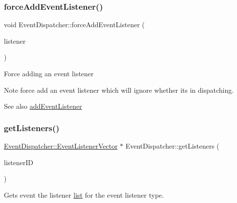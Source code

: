 \subsubsection{\texorpdfstring{force\+Add\+Event\+Listener()}{forceAddEventListener()}\hspace{0.1cm}{\footnotesize\ttfamily [2/2]}}
{\footnotesize\ttfamily void Event\+Dispatcher\+::force\+Add\+Event\+Listener (\begin{DoxyParamCaption}\item[{\hyperlink{classEventListener}{Event\+Listener} $\ast$}]{listener }\end{DoxyParamCaption})\hspace{0.3cm}{\ttfamily [protected]}}

Force adding an event listener \begin{DoxyNote}{Note}
force add an event listener which will ignore whether it\textquotesingle{}s in dispatching. 
\end{DoxyNote}
\begin{DoxySeeAlso}{See also}
\hyperlink{classEventDispatcher_aacb9cc74f76d66952e749f2cc1519444}{add\+Event\+Listener} 
\end{DoxySeeAlso}
\mbox{\label{classEventDispatcher_abbb502e7918b7d2e0033e2e6206b4e1e}} 
\subsubsection{\texorpdfstring{get\+Listeners()}{getListeners()}\hspace{0.1cm}{\footnotesize\ttfamily [1/2]}}
{\footnotesize\ttfamily \hyperlink{classEventDispatcher_1_1EventListenerVector}{Event\+Dispatcher\+::\+Event\+Listener\+Vector} $\ast$ Event\+Dispatcher\+::get\+Listeners (\begin{DoxyParamCaption}\item[{const Event\+Listener\+::\+Listener\+ID \&}]{listener\+ID }\end{DoxyParamCaption})\hspace{0.3cm}{\ttfamily [protected]}}

Gets event the listener \hyperlink{protocollist-p}{list} for the event listener type. \mbox{\label{classEventDispatcher_aa2b7f1d5ebfcef5c2bfedb81b6917906}} 
